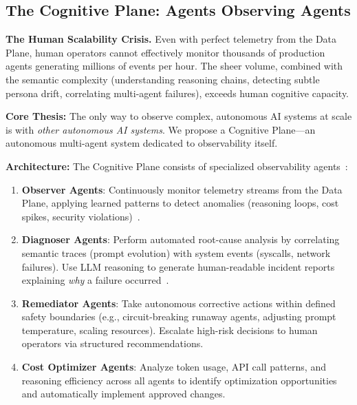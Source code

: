 \documentclass[sigplan,screen，review,9pt]{acmart}
\begin{document}
\subsection{The Cognitive Plane: Agents Observing Agents}

\textbf{The Human Scalability Crisis.} Even with perfect telemetry from the Data Plane, human operators cannot effectively monitor thousands of production agents generating millions of events per hour. The sheer volume, combined with the semantic complexity (understanding reasoning chains, detecting subtle persona drift, correlating multi-agent failures), exceeds human cognitive capacity.

\textbf{Core Thesis:} The only way to observe complex, autonomous AI systems at scale is with \emph{other autonomous AI systems}. We propose a Cognitive Plane—an autonomous multi-agent system dedicated to observability itself.

\textbf{Architecture:} The Cognitive Plane consists of specialized observability agents~\cite{Rombaut2025Watson,Kim2025AgenticInterp}:

\begin{enumerate}
  \item \textbf{Observer Agents}: Continuously monitor telemetry streams from the Data Plane, applying learned patterns to detect anomalies (reasoning loops, cost spikes, security violations)~\cite{Dong2024AgentOps}.

  \item \textbf{Diagnoser Agents}: Perform automated root-cause analysis by correlating semantic traces (prompt evolution) with system events (syscalls, network failures). Use LLM reasoning to generate human-readable incident reports explaining \emph{why} a failure occurred~\cite{Moshkovich2025Pipeline}.

  \item \textbf{Remediator Agents}: Take autonomous corrective actions within defined safety boundaries (e.g., circuit-breaking runaway agents, adjusting prompt temperature, scaling resources). Escalate high-risk decisions to human operators via structured recommendations.

  \item \textbf{Cost Optimizer Agents}: Analyze token usage, API call patterns, and reasoning efficiency across all agents to identify optimization opportunities and automatically implement approved changes.
\end{enumerate}
\end{document}
